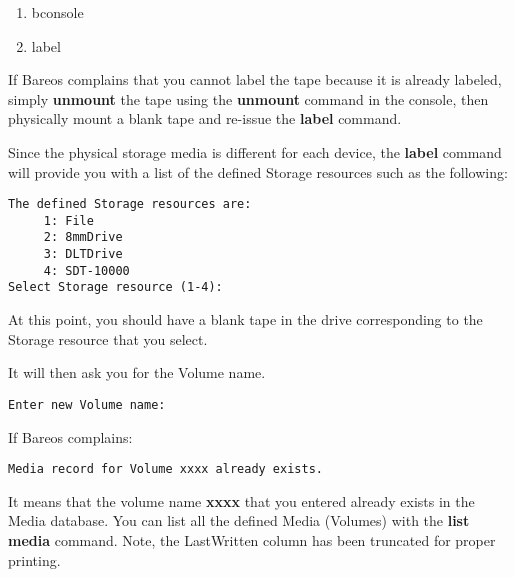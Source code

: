 \begin{enumerate}
\item bconsole
\item label
\end{enumerate}

If Bareos complains that you cannot label the tape because it is already
labeled, simply {\bf unmount} the tape using the {\bf unmount} command in the
console, then physically mount a blank tape and re-issue the {\bf label}
command.

Since the physical storage media is different for each device, the {\bf label}
command will provide you with a list of the defined Storage resources such as
the following:

\footnotesize
\begin{verbatim}
The defined Storage resources are:
     1: File
     2: 8mmDrive
     3: DLTDrive
     4: SDT-10000
Select Storage resource (1-4):
\end{verbatim}
\normalsize

At this point, you should have a blank tape in the drive corresponding to the
Storage resource that you select.

It will then ask you for the Volume name.

\footnotesize
\begin{verbatim}
Enter new Volume name:
\end{verbatim}
\normalsize

If Bareos complains:

\footnotesize
\begin{verbatim}
Media record for Volume xxxx already exists.
\end{verbatim}
\normalsize

It means that the volume name {\bf xxxx} that you entered already exists in
the Media database. You can list all the defined Media (Volumes) with the {\bf
list media} command. Note, the LastWritten column has been truncated for
proper printing.

